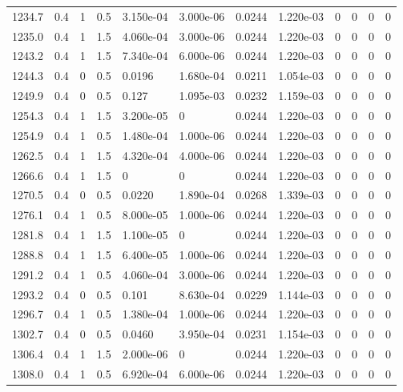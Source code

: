 \documentclass[preview]{standalone}
\begin{document}
{{{{{{{{\begin{tabular}{L{1.2cm}C{1.2cm} C{0.3cm}C{0.5cm} C{1.4cm}C{1.4cm} C{1.4cm}C{1.4cm} C{1.6cm}C{1.6cm} C{1.6cm}C{1.6cm}}
  1234.7  &   0.4  & 1     & 0.5 &  3.150e-04  & 3.000e-06  &  0.0244&   1.220e-03& 0 & 0   &  0 & 0  \\ 
  1235.0  &   0.4  & 1     & 1.5 &  4.060e-04  & 3.000e-06  &  0.0244&   1.220e-03& 0 & 0   &  0 & 0  \\ 
  1243.2  &   0.4  & 1     & 1.5 &  7.340e-04  & 6.000e-06  &  0.0244&   1.220e-03& 0 & 0   &  0 & 0  \\ 
  1244.3  &   0.4  & 0     & 0.5 &  0.0196  & 1.680e-04  &  0.0211&   1.054e-03& 0 & 0   &  0 & 0  \\ 
  1249.9  &   0.4  & 0     & 0.5 &  0.127  & 1.095e-03  &  0.0232&   1.159e-03& 0 & 0   &  0 & 0  \\ 
  1254.3  &   0.4  & 1     & 1.5 &  3.200e-05  & 0  &  0.0244&   1.220e-03& 0 & 0   &  0 & 0  \\ 
  1254.9  &   0.4  & 1     & 0.5 &  1.480e-04  & 1.000e-06  &  0.0244&   1.220e-03& 0 & 0   &  0 & 0  \\ 
  1262.5  &   0.4  & 1     & 1.5 &  4.320e-04  & 4.000e-06  &  0.0244&   1.220e-03& 0 & 0   &  0 & 0  \\ 
  1266.6  &   0.4  & 1     & 1.5 &  0  & 0  &  0.0244&   1.220e-03& 0 & 0   &  0 & 0  \\ 
  1270.5  &   0.4  & 0     & 0.5 &  0.0220  & 1.890e-04  &  0.0268&   1.339e-03& 0 & 0   &  0 & 0  \\ 
  1276.1  &   0.4  & 1     & 0.5 &  8.000e-05  & 1.000e-06  &  0.0244&   1.220e-03& 0 & 0   &  0 & 0  \\ 
  1281.8  &   0.4  & 1     & 1.5 &  1.100e-05  & 0  &  0.0244&   1.220e-03& 0 & 0   &  0 & 0  \\ 
  1288.8  &   0.4  & 1     & 1.5 &  6.400e-05  & 1.000e-06  &  0.0244&   1.220e-03& 0 & 0   &  0 & 0  \\ 
  1291.2  &   0.4  & 1     & 0.5 &  4.060e-04  & 3.000e-06  &  0.0244&   1.220e-03& 0 & 0   &  0 & 0  \\ 
  1293.2  &   0.4  & 0     & 0.5 &  0.101  & 8.630e-04  &  0.0229&   1.144e-03& 0 & 0   &  0 & 0  \\ 
  1296.7  &   0.4  & 1     & 0.5 &  1.380e-04  & 1.000e-06  &  0.0244&   1.220e-03& 0 & 0   &  0 & 0  \\ 
  1302.7  &   0.4  & 0     & 0.5 &  0.0460  & 3.950e-04  &  0.0231&   1.154e-03& 0 & 0   &  0 & 0  \\ 
  1306.4  &   0.4  & 1     & 1.5 &  2.000e-06  & 0  &  0.0244&   1.220e-03& 0 & 0   &  0 & 0  \\ 
  1308.0  &   0.4  & 1     & 0.5 &  6.920e-04  & 6.000e-06  &  0.0244&   1.220e-03& 0 & 0   &  0 & 0  \\ 

\end{tabular}}}}}}}}}
\end{document}
